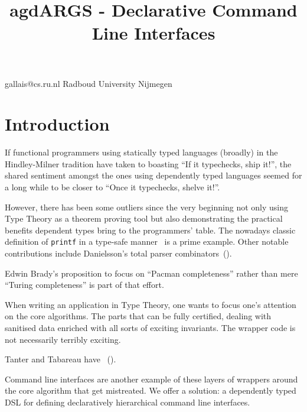 \documentclass[preprint,9pt]{sigplanconf}
\begin{document}

\title{agdARGS - Declarative Command Line Interfaces}

           {gallais@cs.ru.nl}
           {Radboud University Nijmegen}
\maketitle

\section{Introduction}

If functional programmers using statically typed languages (broadly)
in the Hindley-Milner tradition have taken to boasting 
``If it typechecks, ship it!'', the shared sentiment amongst the ones
using dependently typed languages seemed for a long while to be closer
to ``Once it typechecks, shelve it!''.

However, there has been some outliers since the very beginning
not only using Type Theory as a theorem proving tool but also
demonstrating the practical benefits dependent types bring to
the programmers' table. The nowadays classic definition of
\texttt{printf} in a type-safe manner~\cite{augustsson1998cayenne}
is a prime example. Other notable contributions include
Danielsson's total parser combinators~(\citeyear{danielsson2010total}).



Edwin Brady's proposition to focus on ``Pacman completeness''
rather than mere ``Turing completeness'' is part of that effort.


When writing an application in Type Theory, one wants to focus one's
attention on the core algorithms. The parts that can be fully certified,
dealing with sanitised data enriched with all sorts of exciting invariants.
The wrapper code is not necessarily terribly exciting.

Tanter and Tabareau have ~(\citeyear{tanter2015gradual}).

Command line interfaces are another example of these layers of
wrappers around the core algorithm that get mistreated. We offer
a solution: a dependently typed DSL for defining declaratively
hierarchical command line interfaces.
\end{document}
